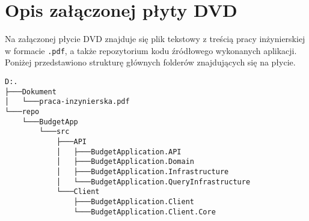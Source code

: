 \chapter{Opis załączonej płyty DVD}
Na załączonej płycie DVD znajduje się plik tekstowy z treścią pracy inżynierskiej w formacie \texttt{.pdf}, a także repozytorium kodu źródłowego wykonanych aplikacji. Poniżej przedstawiono strukturę głównych folderów znajdujących się na płycie.
{\small
\begin{verbatim}
D:.
├───Dokument
│   └───praca-inzynierska.pdf
└───repo
    └───BudgetApp
        └───src
            ├───API
            │   ├───BudgetApplication.API
            │   ├───BudgetApplication.Domain
            │   ├───BudgetApplication.Infrastructure
            │   └───BudgetApplication.QueryInfrastructure
            └───Client
                ├───BudgetApplication.Client
                └───BudgetApplication.Client.Core
\end{verbatim}
}